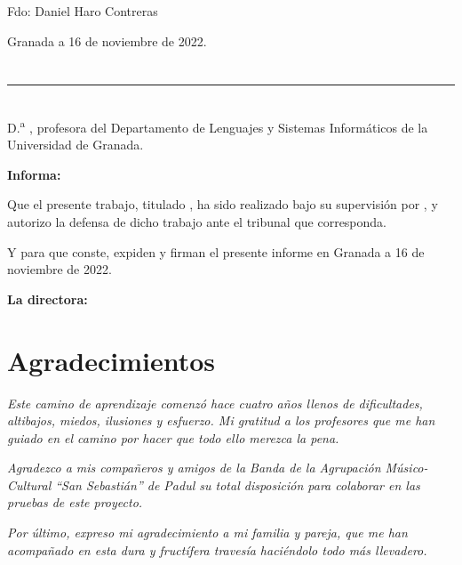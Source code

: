 \vspace{6cm}

\noindent Fdo: Daniel Haro Contreras

\vspace{2cm}

\begin{flushright}
Granada a 16 de noviembre de 2022.
\end{flushright}


\chapter*{}
\thispagestyle{empty}

\noindent\rule[-1ex]{\textwidth}{2pt}\\[4.5ex]

D.\textsuperscript{a} \textbf{\myProf}, profesora del Departamento de Lenguajes y Sistemas Informáticos de la Universidad de Granada.


\vspace{0.5cm}

\textbf{Informa:}

\vspace{0.5cm}

Que el presente trabajo, titulado \textit{\textbf{\myTitle}},
ha sido realizado bajo su supervisión por \textbf{\myName}, y autorizo la defensa de dicho trabajo ante el tribunal
que corresponda.

\vspace{0.5cm}

Y para que conste, expiden y firman el presente informe en Granada a 16 de noviembre de 2022.

\vspace{1cm}

\textbf{La directora:}

\vspace{5cm}

\noindent \textbf{\myProf}

\chapter*{Agradecimientos}
\thispagestyle{empty}

       \vspace{1cm}


\textit{Este camino de aprendizaje comenzó hace cuatro años llenos de dificultades, altibajos, miedos, ilusiones y esfuerzo. Mi gratitud a los profesores que me han guiado en el camino por hacer que todo ello merezca la pena.}

\textit{Agradezco a mis compañeros y amigos de la Banda de la Agrupación Músico-Cultural ``San Sebastián'' de Padul su total disposición para colaborar en las pruebas de este proyecto.}

\textit{Por último, expreso mi agradecimiento a mi familia y pareja, que me han acompañado en esta dura y fructífera travesía haciéndolo todo más llevadero.}
